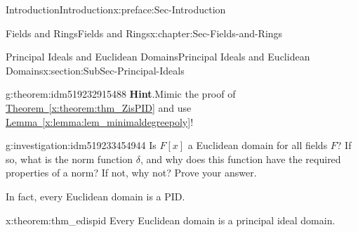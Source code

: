 \documentclass[oneside,10pt,]{book}
\newcommand{\blocktitlefont}{\relax}
\newcommand{\xreffont}{\relax}
\numberwithin{equation}{section}
\begin{document}
\begin{preface}{Introduction}{}{Introduction}{}{}{x:preface:Sec-Introduction}
\begin{chapterptx}{Fields and Rings}{}{Fields and Rings}{}{}{x:chapter:Sec-Fields-and-Rings}
\begin{sectionptx}{Principal Ideals and Euclidean Domains}{}{Principal Ideals and Euclidean Domains}{}{}{x:section:SubSec-Principal-Ideals}
\begin{theorem}{}{}{g:theorem:idm519232915488}
\textbf{\blocktitlefont Hint}.\quad{}Mimic the proof of \hyperref[x:theorem:thm_ZisPID]{Theorem~{\xreffont\ref{x:theorem:thm_ZisPID}}} and use \hyperref[x:lemma:lem_minimaldegreepoly]{Lemma~{\xreffont\ref{x:lemma:lem_minimaldegreepoly}}}!%
\end{theorem}
\begin{investigation}{}{g:investigation:idm519233454944}%
Is \(F[x]\) a Euclidean domain for all fields \(F\)? If so, what is the norm function \(\delta\), and why does this function have the required properties of a norm? If not, why not? Prove your answer.%
\end{investigation}
In fact, every Euclidean domain is a PID.%
\begin{theorem}{}{}{x:theorem:thm_edispid}%
Every Euclidean domain is a principal ideal domain.%



\end{theorem}
\end{sectionptx}
\end{chapterptx}
\end{preface}
\end{document}
